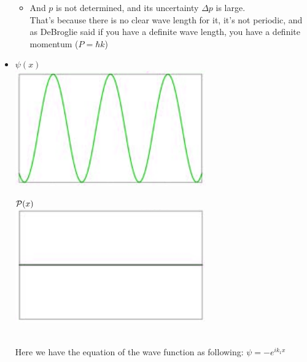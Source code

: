 \documentclass[12pt,oneside]{book}
\begin{document}
\begin{itemize}
\begin{itemize}
		      \item And $p$ is not determined, and its uncertainty $\Delta p$ is large.\\
		            That's because there is no clear wave length for it, it's not periodic, and as DeBroglie said if you have a definite wave length, you have a definite momentum ($P= \hbar k$)
	      \end{itemize}
	      \item\begin{minipage}{0.3\linewidth}
		      $\psi(x)$ \\
		      \includegraphics[width=\linewidth]{../pic/3302/10.png}\\
	      \end{minipage}
	      \begin{minipage}{0.3\linewidth}
		      $\mathcal{P}(x)$\\
		      \includegraphics[width=\linewidth]{../pic/3302/11.png}
	      \end{minipage}\\
	      Here we have the equation of the wave function as following: $\psi = - e^{ik_1x}$ \\

\end{itemize}
\end{document}
